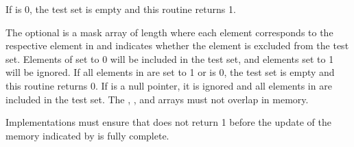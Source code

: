 \begin{apidefinition}
{    If  is 0, the test set is empty and this routine returns 1.

    The optional  is a mask array of length  where each element
    corresponds to the respective element in  and indicates whether
    the element is excluded from the test set.  Elements of  set to
    0 will be included in the test set, and elements set to 1 will be ignored.  If all elements
    in  are set to 1 or  is 0, the test set is empty
    and this routine returns 0.  If  is a null pointer, it is
    ignored and all elements in  are included in the test set.  The
    , , and  arrays must not overlap in
    memory.

    Implementations must ensure that  does not return 1
    before the update of the memory indicated by  is fully complete.
}


\end{apidefinition}
